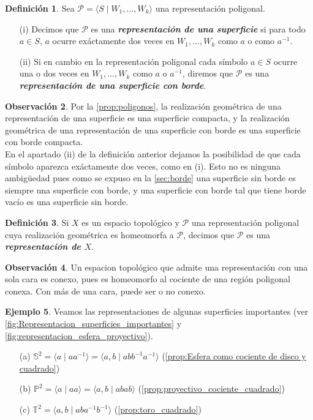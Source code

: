\documentclass[10pt]{report}
\newcommand{\Toro}{\mathbb{T}^2}
\newcommand{\enfatiza}[1]{\textbf{\textit{#1}}}
\theoremstyle{definition}
\newtheorem{defin}{Definición}[section]
\newtheorem{obs}[defin]{Observación}
\newtheorem{eje}[defin]{Ejemplo}
\begin{document}
\begin{defin}%
Sea $\mathcal{P} =\langle S\mid W_1,\dots ,W_k\rangle$ una representación poligonal. 
\begin{itemize}
\item[(i)] Decimos que $\mathcal{P}$ es una \enfatiza{representación de una superficie} si para todo $a\in S$, $a$ ocurre exáctamente dos veces en $W_1,...,W_k$ como $a$ o como $a^{-1}$.
\item[(ii)] Si en cambio en la representación poligonal cada símbolo $a\in S$ ocurre una o dos veces en $W_1,\dots ,W_k$ como $a$ o $a^{-1}$, diremos que $\mathcal{P}$ es una \enfatiza{representación de una superficie con borde}. 
\end{itemize}
\end{defin}
\begin{obs}%
Por la \autoref{prop:poligonos}, la realización geométrica de una representación de una superficie es una superficie compacta, y la realización geométrica de una representación de una superficie con borde es una superficie con borde compacta.\\
En el apartado (ii) de la definición anterior dejamos la posibilidad de que cada símbolo aparezca exáctamente dos veces, como en (i). Esto no es ninguna ambigüedad pues como se expuso en la \autoref{sec:borde} una superficie sin borde es siempre una superficie con borde, y una superficie con borde tal que tiene borde vacío es una superficie sin borde.
\end{obs}
\begin{defin}%
Si $X$ es un espacio topológico y $\mathcal{P}$ una representación poligonal cuya realización geométrica es homeomorfa a $\mathcal{P}$, decimos que $\mathcal{P}$ es una \textbf{\emph{representación de $X$}}.
\end{defin}
\begin{obs}%
Un espacion topológico que admite una representación con una sola cara es conexo, pues es homeomorfo al cociente de una región poligonal conexa. Con más de una cara, puede ser o no conexo.
\end{obs}

\begin{eje}\label{eje:rep_sup_importantes}%
Veamos las representaciones de algunas superficies importantes (ver \autoref{fig:Representacion_superficies_importantes} y \autoref{fig:representacion_esfera_proyectivo}).
\begin{itemize}
\item[(a)] $\mathbb{S}^2=\langle a\mid aa^{-1}\rangle=\langle a,b\mid  abb^{-1}a^{-1}\rangle$ (\autoref{prop:Esfera como cociente de disco y cuadrado})
\item[(b)] $\mathbb{P}^2= \langle a\mid aa \rangle = \langle a,b\mid abab \rangle$ (\autoref{prop:proyectivo_cociente_cuadrado})
\item[(c)] $\Toro=\langle a,b\mid aba^{-1}b^{-1}\rangle$ (\autoref{prop:toro_cuadrado})
\end{itemize}
\end{eje}
\end{document}
